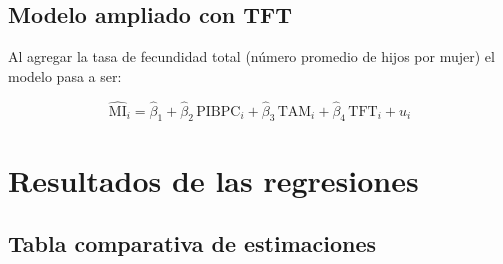 \documentclass[12pt, letterpaper]{article}
\newcommand{\betahat}{\hat{\beta}}
\begin{document}
\subsection{Modelo ampliado con TFT}

Al agregar la tasa de fecundidad total (número promedio de hijos por mujer) el
modelo pasa a ser:

\begin{equation}
  \widehat{\text{MI}}_i
    = \betahat_1
    + \betahat_2\,\text{PIBPC}_i
    + \betahat_3\,\text{TAM}_i
    + \betahat_4\,\text{TFT}_i
    + u_i
  \label{eq:ampliado}
\end{equation}

\section{Resultados de las regresiones}

\subsection{Tabla comparativa de estimaciones}
\end{document}
